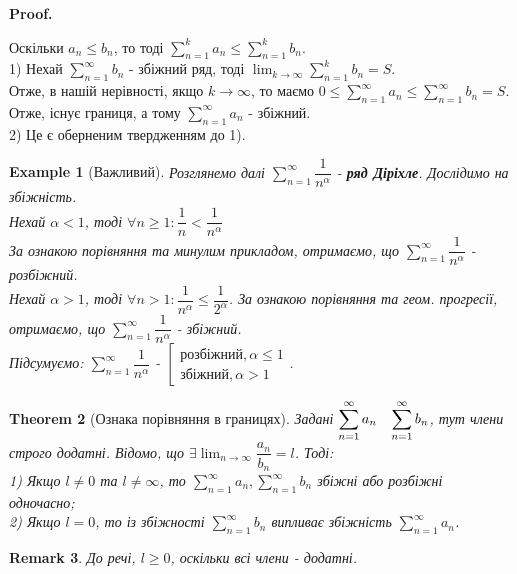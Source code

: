 \documentclass[a4paper, 10pt]{article}
\makeatletter
\def\huge{\displaystyle}
\def\qed{$\blacksquare$}
\theoremstyle{theoremdd}
\newtheorem{theorem}{Theorem}[subsection]
\theoremstyle{theoremdd}
\theoremstyle{theoremdd}
\theoremstyle{theoremdd}
\newtheorem{example}[theorem]{Example}
\theoremstyle{theoremdd}
\theoremstyle{theoremdd}
\newtheorem{remark}[theorem]{Remark}
\theoremstyle{theoremdd}
\theoremstyle{theoremdd}
\renewenvironment{proof}[1][Proof.\\]{\par
\pushQED{\hfill \qed}%
\normalfont \topsep6\p@\@plus6\p@\relax
\trivlist
\item\relax
{\bfseries
#1\@addpunct{.}}\hspace\labelsep\ignorespaces
}{%
\popQED\endtrivlist\@endpefalse
}
\makeatother
\begin{document}
\begin{proof}
Оскільки $a_n \leq b_n$, то тоді $\huge \sum_{n=1}^k a_n \leq \sum_{n=1}^k b_n$.\\
1) Нехай $\huge \sum_{n=1}^\infty b_n$ - збіжний ряд, тоді $\huge\lim_{k \to \infty} \sum_{n=1}^k b_n = S$.\\
Отже, в нашій нерівності, якщо $k \to \infty$, то маємо $0 \leq \huge\sum_{n=1}^\infty a_n \leq \sum_{n=1}^\infty b_n = S$.
Отже, існує границя, а тому $\huge \sum_{n=1}^\infty a_n$ - збіжний.\\
2) Це є оберненим твердженням до 1).
\end{proof}

\begin{example}[Важливий]
Розглянемо далі $\huge \sum_{n=1}^{\infty} \dfrac{1}{n^\alpha}$ - \textbf{ряд Діріхле}. Дослідимо на збіжність.\\
Нехай $\alpha < 1$, тоді $\forall n \geq 1: \dfrac{1}{n} < \dfrac{1}{n^{\alpha}}$\\
За ознакою порівняння та минулим прикладом, отримаємо, що $\huge \sum_{n=1}^{\infty} \dfrac{1}{n^\alpha}$ - розбіжний.\\
Нехай $\alpha > 1$, тоді $\forall n > 1: \dfrac{1}{n^\alpha} \leq \dfrac{1}{2^{\alpha}}$.
За ознакою порівняння та геом. прогресії, отримаємо, що $\huge \sum_{n=1}^\infty \dfrac{1}{n^{\alpha}}$ - збіжний.\\
Підсумуємо: $\huge \sum_{n=1}^{\infty} \dfrac{1}{n^{\alpha}}$ - $\left[ \begin{gathered} \textrm{розбіжний}, \alpha \leq 1 \\ \textrm{збіжний}, \alpha > 1   \end{gathered} \right.$.
\end{example}

\begin{theorem}[Ознака порівняння в границях]
Задані $\huge \sum_{n=1}^{\infty} a_n \hspace{0.3cm} \sum_{n=1}^{\infty} b_n$, тут члени строго додатні. Відомо, що $\exists \huge \lim_{n \to \infty} \dfrac{a_n}{b_n} = l$. Тоді:\\
1) Якщо $l \neq 0$ та $l \neq \infty$, то $\huge \sum_{n=1}^{\infty} a_n, \sum_{n=1}^{\infty} b_n$ збіжні або розбіжні одночасно;\\
2) Якщо $l = 0$, то із збіжності $\huge \sum_{n=1}^{\infty} b_n$ випливає збіжність $\huge \sum_{n=1}^{\infty} a_n$.
\end{theorem}

\begin{remark}
До речі, $l \geq 0$, оскільки всі члени - додатні.
\end{remark}
\end{document}
